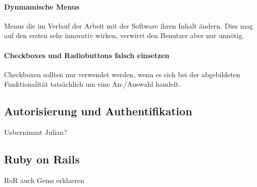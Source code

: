 \paragraph{Dynmamische Menus}

Menus die im Verlauf der Arbeit mit der Software ihren Inhalt ändern. Dies mag
auf den ersten sehr innovativ wirken, verwirrt den Benutzer aber nur unnötig.

\paragraph{Checkboxes und Radiobuttons falsch einsetzen}

Checkboxen sollten nur verwendet werden, wenn es sich bei der abgebildeten
Funktionalität tatsächlich um eine An-/Auswahl handelt.

\subsection{Autorisierung und Authentifikation}
\begin{k}
Uebernimmt Julian?
\end{k}

\subsection{Ruby on Rails}
\begin{k}
\ac{RoR}
auch Gems erklaeren\label{ref:baseGem}
\end{k}